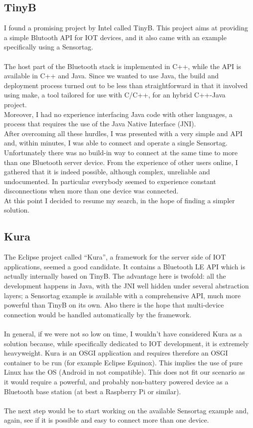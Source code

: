 \documentclass[conference,12pt]{IEEETran}
\begin{document}
\subsection{TinyB}
I found a promising project by Intel called TinyB. This project aims at providing a simple Blutooth API for IOT devices, and it also came with an example specifically using a Sensortag.\\\\
The host part of the Bluetooth stack is implemented in C++, while the API is available in C++ and Java. Since we wanted to use Java, the build and deployment process turned out to be less than straightforward in that it involved using make, a tool tailored for use with C/C++, for an hybrid C++-Java project.\\
Moreover, I had no experience interfacing Java code with other languages, a process that requires the use of the Java Native Interface (JNI).\\
After overcoming all these hurdles, I was presented with a very simple and API and, within minutes, I was able to connect and operate a single Sensortag. Unfortunately there was no build-in way to connect at the same time to more than one Bluetooth server device. From the experience of other users online, I gathered that it is indeed possible, although complex, unreliable and undocumented. In particular everybody seemed to experience constant disconnections when more than one device was connected.\\
At this point I decided to resume my search, in the hope of finding a simpler solution.


\subsection{Kura}
The Eclipse project called “Kura”, a framework for the server side of IOT applications, seemed a good candidate. It contains a Bluetooth LE API which is actually internally based on TinyB. The advantage here is twofold: all the development happens in Java, with the JNI well hidden under several abstraction layers; a Sensortag example is available with a comprehensive API, much more powerful than TinyB on its own. Also there is the hope that multi-device connection would be handled automatically by the framework.\\\\
In general, if we were not so low on time, I wouldn’t have considered Kura as a solution because, while specifically dedicated to IOT development, it is extremely heavyweight. Kura is an OSGI application and requires therefore an OSGI container to be run (for example Eclipse Equinox). This implies the use of pure Linux has the OS (Android in not compatible). This does not fit our scenario as it would require a powerful, and probably non-battery powered device as a Bluetooth base station (at best a Raspberry Pi or similar).\\\\
The next step would be to start working on the available Sensortag example and, again, see if it is possible and easy to connect more than one device.\\
\end{document}
